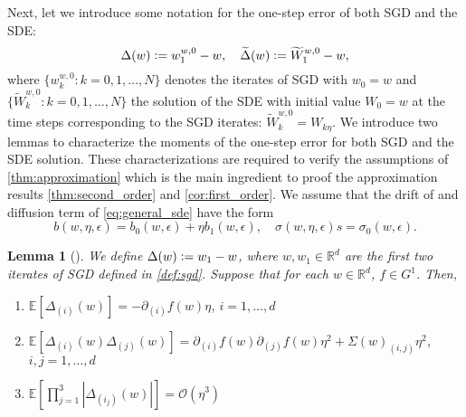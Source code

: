 \documentclass[12pt]{article}
\newtheorem{lemma}[lemma]{Lemma}
\theoremstyle{definition}
\numberwithin{equation}{section}
\newcommand{\R}{\mathbb{R}}
\newcommand{\ev}[1]{\mathbb{E}\left[{#1}\right]}
\newcommand{\defeq}{\vcentcolon=}
\begin{document}
Next, let we introduce some notation for the one-step error of both SGD and the SDE:
\begin{equation*}
  \Delta(w) \defeq w_{1}^{w,0} - w, \quad \widetilde{\Delta}(w) \defeq \widetilde{W}^{w,0}_1 - w,
\end{equation*}
where $\{w_k^{w,0}: k = 0,1,\dots, N\}$ denotes the iterates of SGD with $w_0 = w$ and $\{\widetilde{W}_k^{w,0}: k = 0,1,\dots, N\}$ the solution of the SDE with initial value $W_0 = w$ at the time steps corresponding to the SGD iterates: $\widetilde{W}_k^{w,0} = W_{k\eta}$.
We introduce two lemmas to characterize the moments of the one-step error for both SGD and the SDE solution. These characterizations are required to verify the assumptions of \autoref{thm:approximation} which is the main ingredient to proof the approximation results \autoref{thm:second_order} and \autoref{cor:first_order}. We assume that the drift of and diffusion term of \eqref{eq:general_sde} have the form 
\begin{equation*}
  b(w,\eta, \epsilon) = b_0(w, \epsilon) + \eta b_1(w, \epsilon), \quad \sigma(w,\eta, \epsilon) s= \sigma_0(w, \epsilon).
\end{equation*}
\begin{lemma}[]
  \label{lem:sgd_one_step}
  We define $\Delta(w) \defeq w_{1} - w$, where $w, w_{1} \in \R^d$ are the first two iterates of SGD defined in \autoref{def:sgd}. Suppose that for each $w \in \R^d$, $f \in G^1$. Then,
  \begin{enumerate}[label=(\roman*)]
    \item $\ev{\Delta_{(i)}(w)} = -\partial_{(i)} f(w) \eta$, $i = 1,\dots,d$
    \item $\ev{\Delta_{(i)}(w)\Delta_{(j)}(w)} = \partial_{(i)} f(w)\partial_{(j)} f(w) \eta^2 + \Sigma(w)_{(i,j)}\eta^2$, $i,j = 1,\dots,d$
    \item $\ev{\prod_{j=1}^3\left\lvert \Delta_{(i_j)}(w)\right\rvert} = \mathcal{O}(\eta^3)$
  \end{enumerate}
\end{lemma}
\end{document}
